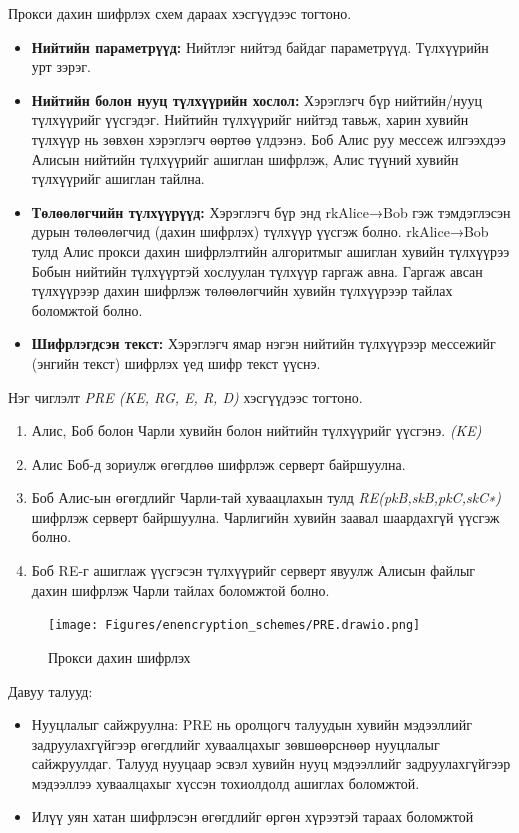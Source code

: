 Прокси дахин шифрлэх схем дараах хэсгүүдээс тогтоно.
\begin{itemize}
    \item \textbf{Нийтийн параметрүүд:} Нийтлэг нийтэд байдаг параметрүүд. Түлхүүрийн урт зэрэг.

    \item \textbf{Нийтийн болон нууц түлхүүрийн хослол:} Хэрэглэгч бүр нийтийн/нууц түлхүүрийг үүсгэдэг. Нийтийн түлхүүрийг нийтэд тавьж, харин хувийн түлхүүр нь зөвхөн хэрэглэгч өөртөө үлдээнэ. Боб Алис руу мессеж илгээхдээ Алисын нийтийн түлхүүрийг ашиглан шифрлэж, Алис түүний хувийн түлхүүрийг ашиглан тайлна.

    \item \textbf{Төлөөлөгчийн түлхүүрүүд:} Хэрэглэгч бүр энд rkAlice→Bob гэж тэмдэглэсэн дурын төлөөлөгчид (дахин шифрлэх) түлхүүр үүсгэж болно. rkAlice→Bob тулд Алис прокси дахин шифрлэлтийн алгоритмыг ашиглан хувийн түлхүүрээ Бобын нийтийн түлхүүртэй хослуулан түлхүүр гаргаж авна. Гаргаж авсан түлхүүрээр дахин шифрлэж төлөөлөгчийн хувийн түлхүүрээр тайлах боломжтой болно.

    \item \textbf{Шифрлэгдсэн текст:} Хэрэглэгч ямар нэгэн нийтийн түлхүүрээр мессежийг (энгийн текст) шифрлэх үед шифр текст үүснэ.
\end{itemize}

Нэг чиглэлт \emph{PRE (KE, RG, E, R, D)} хэсгүүдээс тогтоно.
\begin{enumerate}
    \item Алис, Боб болон Чарли хувийн болон нийтийн түлхүүрийг үүсгэнэ. \emph{(KE)}
    \item Алис Боб-д зориулж өгөгдлөө шифрлэж серверт байршуулна.
    \item Боб Алис-ын өгөгдлийг Чарли-тай хуваацлахын тулд \emph{RE(pkB,skB,pkC,skC∗)} шифрлэж серверт байршуулна. Чарлигийн хувийн заавал шаардахгүй үүсгэж болно.
    \item Боб RE-г ашиглаж үүсгэсэн түлхүүрийг серверт явуулж Алисын файлыг дахин шифрлэж Чарли тайлах боломжтой болно.
\end{enumerate}

\begin{figure}[ht]
    \centering
    \texttt{[image: Figures/enencryption\_schemes/PRE.drawio.png]}
    \caption[Proxy Re-encryption scheme]{Прокси дахин шифрлэх}
    \label{fig:PRE_Scheme}
\end{figure}

Давуу талууд:
\begin{itemize}
    \item Нууцлалыг сайжруулна: PRE нь оролцогч талуудын хувийн мэдээллийг задруулахгүйгээр өгөгдлийг хуваалцахыг зөвшөөрснөөр нууцлалыг сайжруулдаг. Талууд нууцаар эсвэл хувийн нууц мэдээллийг задруулахгүйгээр мэдээллээ хуваалцахыг хүссэн тохиолдолд ашиглах боломжтой.
    \item Илүү уян хатан шифрлэсэн өгөгдлийг өргөн хүрээтэй тараах боломжтой
\end{itemize}

